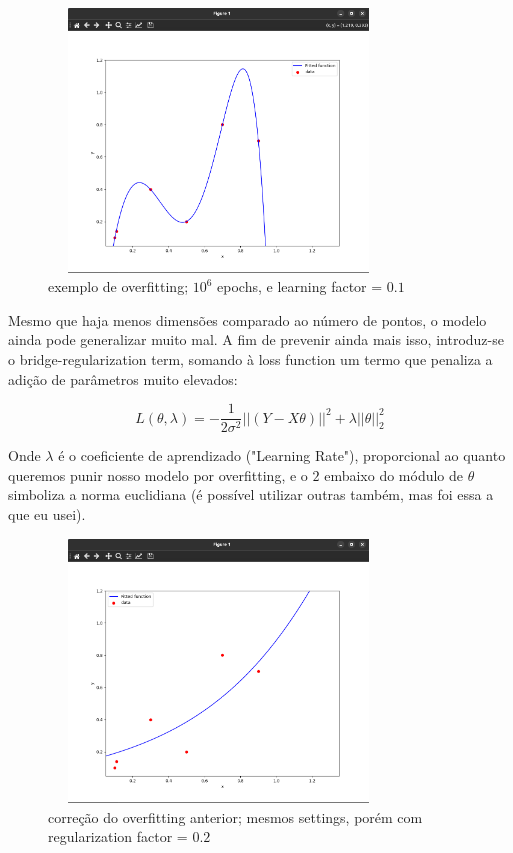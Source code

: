 \documentclass{article}
\begin{document}
\begin{figure}[h!]
    \includegraphics[width=9cm, height=7cm]{overfit.png}
    \centering
    \caption{exemplo de overfitting; $10^{6}$ epochs, e 
    learning factor = $0.1$}
  \end{figure}

Mesmo que haja menos dimensões comparado ao número de pontos,
o modelo ainda pode generalizar muito mal. A fim de prevenir
ainda mais isso, introduz-se o bridge-regularization term, 
somando à loss function um termo que penaliza a adição de 
parâmetros muito elevados:

\begin{equation} \label{eq:14}
    L(\theta, \lambda) = -\frac{1}{2\sigma^{2}}
    ||(Y - X\theta)||^{2} + \lambda
    ||\theta||_{2}^{2}
\end{equation}

Onde $\lambda$ é o coeficiente de aprendizado ("Learning Rate"),
proporcional ao quanto queremos punir nosso modelo por 
overfitting, e o $2$ embaixo do módulo de $\theta$ simboliza
a norma euclidiana (é possível utilizar outras também, mas 
foi essa a que eu usei).

\begin{figure}[h!]
    \includegraphics[width=9cm, height=7cm]{fit.png}
    \centering
    \caption{correção do overfitting anterior; mesmos settings,
    porém com regularization factor = $0.2$}
  \end{figure}
\end{document}
